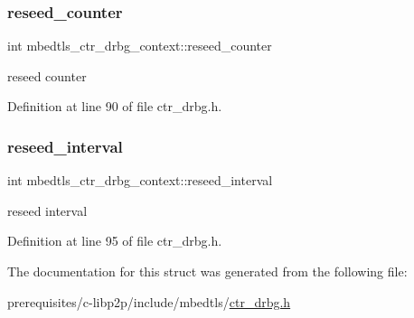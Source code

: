 \subsubsection{\texorpdfstring{reseed\+\_\+counter}{reseed\_counter}}
{\footnotesize\ttfamily int mbedtls\+\_\+ctr\+\_\+drbg\+\_\+context\+::reseed\+\_\+counter}

reseed counter 

Definition at line 90 of file ctr\+\_\+drbg.\+h.

\mbox{\label{structmbedtls__ctr__drbg__context_a7b048c97f8dc916d89a0c7cd9d7f8522}} 
\subsubsection{\texorpdfstring{reseed\+\_\+interval}{reseed\_interval}}
{\footnotesize\ttfamily int mbedtls\+\_\+ctr\+\_\+drbg\+\_\+context\+::reseed\+\_\+interval}

reseed interval 

Definition at line 95 of file ctr\+\_\+drbg.\+h.



The documentation for this struct was generated from the following file\+:\begin{DoxyCompactItemize}
\item 
prerequisites/c-\/libp2p/include/mbedtls/\mbox{\hyperlink{ctr__drbg_8h}{ctr\+\_\+drbg.\+h}}\end{DoxyCompactItemize}
